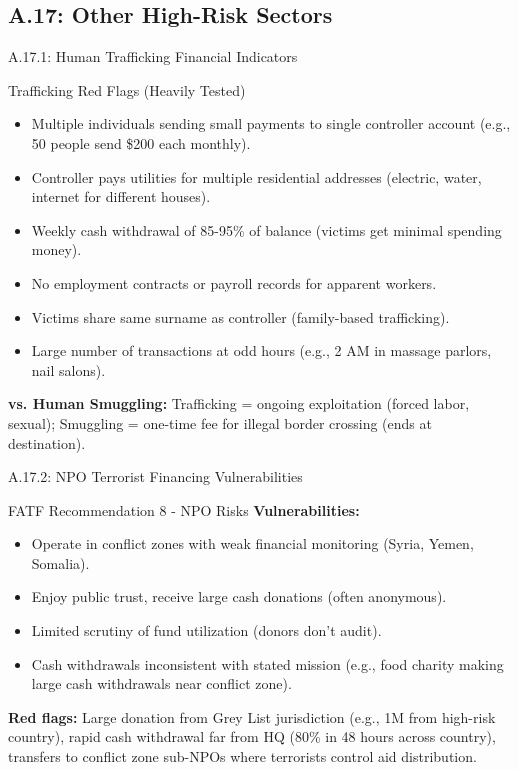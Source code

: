 \documentclass{beamer}
\begin{document}
	\subsection{A.17: Other High-Risk Sectors}
	
	\begin{frame}{A.17.1: Human Trafficking Financial Indicators}
		\begin{block}{Trafficking Red Flags (Heavily Tested)}
			\begin{itemize}
				\item Multiple individuals sending small payments to single controller account (e.g., 50 people send \$200 each monthly).
				\item Controller pays utilities for multiple residential addresses (electric, water, internet for different houses).
				\item Weekly cash withdrawal of 85-95\% of balance (victims get minimal spending money).
				\item No employment contracts or payroll records for apparent workers.
				\item Victims share same surname as controller (family-based trafficking).
				\item Large number of transactions at odd hours (e.g., 2 AM in massage parlors, nail salons).
			\end{itemize}
		\end{block}
		\textbf{vs. Human Smuggling:} Trafficking = ongoing exploitation (forced labor, sexual); Smuggling = one-time fee for illegal border crossing (ends at destination).
	\end{frame}
	
	\begin{frame}{A.17.2: NPO Terrorist Financing Vulnerabilities}
		\begin{block}{FATF Recommendation 8 - NPO Risks}
			\textbf{Vulnerabilities:}
			\begin{itemize}
				\item Operate in conflict zones with weak financial monitoring (Syria, Yemen, Somalia).
				\item Enjoy public trust, receive large cash donations (often anonymous).
				\item Limited scrutiny of fund utilization (donors don't audit).
				\item Cash withdrawals inconsistent with stated mission (e.g., food charity making large cash withdrawals near conflict zone).
			\end{itemize}
		\end{block}
		\textbf{Red flags:} Large donation from Grey List jurisdiction (e.g., 1M from high-risk country), rapid cash withdrawal far from HQ (80\% in 48 hours across country), transfers to conflict zone sub-NPOs where terrorists control aid distribution.
	\end{frame}
	
\end{document}
